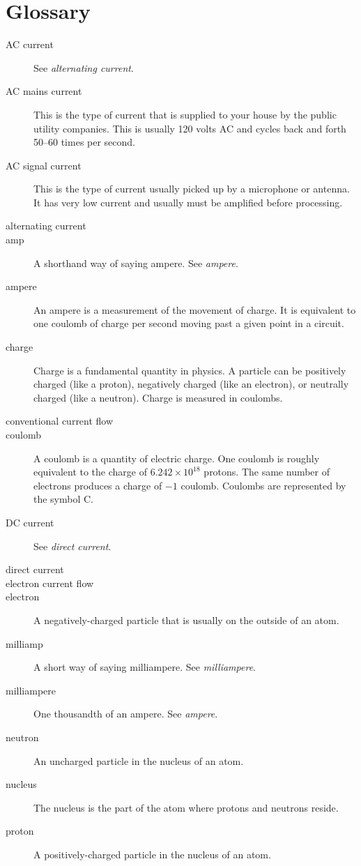 \chapter{Glossary}
\label{chapGlossary}

\begin{description}
\item[AC current] See \emph{alternating current}.
\item[AC mains current] This is the type of current that is supplied to your house by the public utility companies.  This is usually 120 volts AC and cycles back and forth 50--60 times per second.
\item[AC signal current] This is the type of current usually picked up by a microphone or antenna.  It has very low current and usually must be amplified before processing.
\item[alternating current]
\item[amp] A shorthand way of saying ampere.  See \emph{ampere}.
\item[ampere] An ampere is a measurement of the movement of charge.  It is equivalent to one coulomb of charge per second moving past a given point in a circuit.
\item[charge] Charge is a fundamental quantity in physics.  A particle can be positively charged (like a proton), negatively charged (like an electron), or neutrally charged (like a neutron).  Charge is measured in coulombs.
\item[conventional current flow]
\item[coulomb] A coulomb is a quantity of electric charge.  One coulomb is roughly equivalent to the charge of $6.242×10^18$ protons.  The same number of electrons produces a charge of $-1$ coulomb.  Coulombs are represented by the symbol C.
\item[DC current] See \emph{direct current}.
\item[direct current]
\item[electron current flow]
\item[electron] A negatively-charged particle that is usually on the outside of an atom.
\item[milliamp] A short way of saying milliampere.  See \emph{milliampere}.
\item[milliampere] One thousandth of an ampere.  See \emph{ampere}.
\item[neutron] An uncharged particle in the nucleus of an atom.
\item[nucleus] The nucleus is the part of the atom where protons and neutrons reside. 
\item[proton] A positively-charged particle in the nucleus of an atom.

\end{description}
